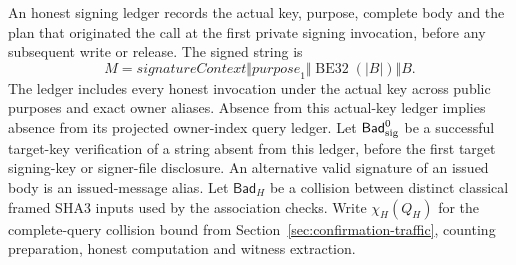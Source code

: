 An honest signing ledger records the actual key, purpose, complete body
and the plan that originated the call at the first private signing invocation,
before any subsequent write or release. The signed string is
\[
 M=\mathit{signatureContext}\Vert\mathit{purpose}_{1}
       \Vert\operatorname{BE32}(|B|)\Vert B.
\]
The ledger includes every honest invocation under the actual key across
public purposes and exact owner aliases. Absence from this actual-key
ledger implies absence from its projected owner-index query ledger.
Let $\mathsf{Bad}_{\rm sig}^{0}$ be a successful target-key verification
of a string absent from this ledger, before the first target signing-key
or signer-file disclosure. An alternative valid signature of an issued
body is an issued-message alias. Let $\mathsf{Bad}_H$ be a collision
between distinct classical framed SHA3 inputs used by the association
checks. Write $\chi_H(Q_H)$ for the complete-query collision bound from
Section~\ref{sec:confirmation-traffic}, counting preparation, honest
computation and witness extraction.


